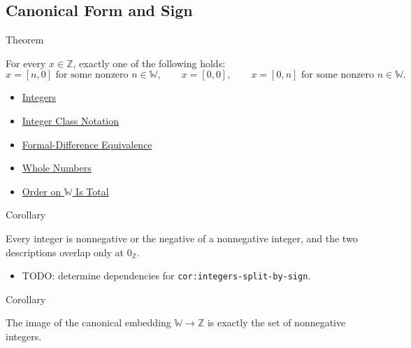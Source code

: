 \subsection*{Canonical Form and Sign}

\begin{theorembox}{Theorem}
\begin{theorem}
\label{thm:canonical-form-of-integers}
For every $x\in\mathbb{Z}$, exactly one of the following holds:
\[
x=[n,0]\text{ for some nonzero }n\in\mathbb{W},\qquad
x=[0,0],\qquad
x=[0,n]\text{ for some nonzero }n\in\mathbb{W}.
\]
\end{theorem}
\end{theorembox}

\begin{dependencies}
\begin{itemize}
  \item \hyperref[def:integers]{Integers}
  \item \hyperref[def:integer-class-notation]{Integer Class Notation}
  \item \hyperref[def:formal-difference-equivalence]{Formal-Difference Equivalence}
  \item \hyperref[def:whole-numbers]{Whole Numbers}
  \item \hyperref[thm:order-on-w-total]{Order on $\mathbb{W}$ Is Total}
\end{itemize}
\end{dependencies}

\begin{corollarybox}{Corollary}
\begin{corollary}
\label{cor:integers-split-by-sign}
Every integer is nonnegative or the negative of a nonnegative integer, and
the two descriptions overlap only at $0_{\mathbb{Z}}$.
\end{corollary}
\end{corollarybox}

\begin{dependencies}
\begin{itemize}
  \item TODO: determine dependencies for \texttt{cor:integers-split-by-sign}.
\end{itemize}
\end{dependencies}

\begin{corollarybox}{Corollary}
\begin{corollary}
\label{cor:image-of-embedding-is-nonnegatives}
The image of the canonical embedding $\mathbb{W}\to\mathbb{Z}$ is exactly
the set of nonnegative integers.
\end{corollary}
\end{corollarybox}

